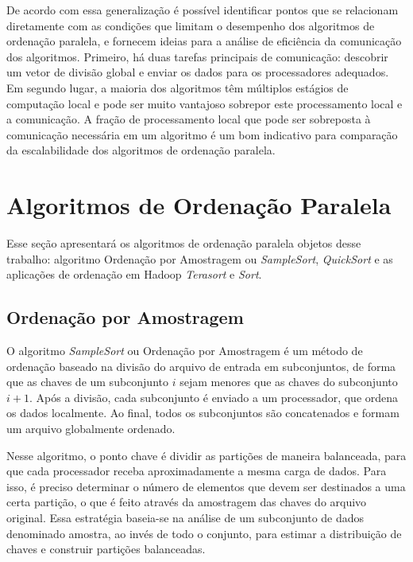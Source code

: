 De acordo com essa generalização  é possível identificar pontos que se relacionam diretamente com as condições que limitam o desempenho dos algoritmos de ordenação paralela, e fornecem ideias para a análise de eficiência da comunicação dos algoritmos. 
Primeiro, há duas tarefas principais de comunicação: descobrir um vetor de divisão global e enviar os dados para os processadores adequados. 
Em segundo lugar, a maioria dos algoritmos têm múltiplos estágios de computação local e pode ser muito vantajoso sobrepor este processamento local e a comunicação. 
A fração de  processamento local que pode ser sobreposta à comunicação necessária em um algoritmo  é um bom indicativo para comparação da escalabilidade dos algoritmos de ordenação paralela.

\section{Algoritmos de Ordenação Paralela}

Esse seção apresentará os algoritmos de ordenação paralela objetos desse trabalho: algoritmo Ordenação por Amostragem ou \textit{SampleSort}, \textit{QuickSort} e as aplicações de ordenação em Hadoop \textit{Terasort} e \textit{Sort}.  

\subsection{Ordenação por Amostragem}

O algoritmo \textit{SampleSort} ou Ordenação por Amostragem é um método de ordenação baseado na divisão do arquivo de entrada em subconjuntos, de forma que as chaves de um subconjunto $i$ sejam menores que as chaves do subconjunto $i+1$. Após a divisão, cada subconjunto é enviado a um processador, que ordena os dados localmente. Ao final, todos os subconjuntos são concatenados e formam um arquivo globalmente ordenado.

Nesse algoritmo, o ponto chave é dividir as partições de maneira balanceada, para que cada processador receba aproximadamente a mesma carga de dados. Para isso, é preciso determinar o número de elementos que devem ser destinados a uma certa partição, o que é feito através da amostragem das chaves do arquivo original. Essa estratégia baseia-se na análise de um subconjunto de dados  denominado amostra, ao invés de todo o conjunto, para estimar a distribuição de chaves e construir partições balanceadas.

